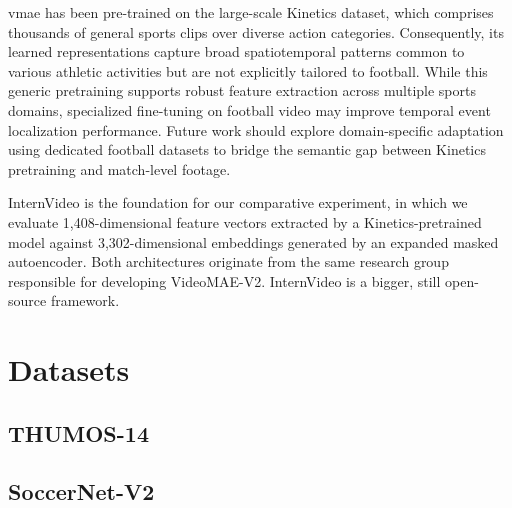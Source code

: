 \acrlong{vmae} has been pre-trained on the large-scale Kinetics dataset, which comprises thousands of general sports clips over diverse action categories. Consequently, its learned representations capture broad spatiotemporal patterns common to various athletic activities but are not explicitly tailored to football. While this generic pretraining supports robust feature extraction across multiple sports domains, specialized fine-tuning on football video may improve temporal event localization performance. Future work should explore domain-specific adaptation using dedicated football datasets to bridge the semantic gap between Kinetics pretraining and match-level footage. 

InternVideo is the foundation for our comparative experiment, in which we evaluate 1,408-dimensional feature vectors extracted by a Kinetics-pretrained model against 3,302-dimensional embeddings generated by an expanded masked autoencoder. Both architectures originate from the same research group responsible for developing VideoMAE-V2. InternVideo is a bigger, still open-source framework.


\section{Datasets}
\label{sec:method_datasets}

\subsection{THUMOS-14}

\subsection{SoccerNet-V2}

